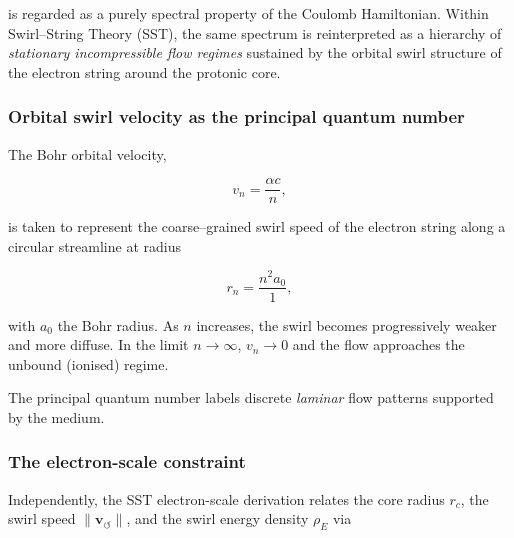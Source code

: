 \documentclass[10pt,reprint,aps,onecolumn,nofootinbib]{revtex4-2}
\begin{document}
        is regarded as a purely spectral property of the Coulomb Hamiltonian.
        Within Swirl--String Theory (SST), the same spectrum is reinterpreted as
        a hierarchy of \emph{stationary incompressible flow regimes} sustained
        by the orbital swirl structure of the electron string around the
        protonic core.

        \subsubsection*{Orbital swirl velocity as the principal quantum number}

            The Bohr orbital velocity,

            \begin{equation}
                v_n = \frac{\alpha c}{n},
            \end{equation}

            is taken to represent the coarse--grained swirl speed of the electron
            string along a circular streamline at radius

            \begin{equation}
                r_n = \frac{n^2 a_0}{1},
            \end{equation}

            with $a_0$ the Bohr radius. As $n$ increases, the swirl becomes
            progressively weaker and more diffuse. In the limit $n\to\infty$,
            $v_n\to 0$ and the flow approaches the unbound (ionised) regime.

            The principal quantum number labels discrete \emph{laminar} flow
            patterns supported by the medium.

        \subsubsection*{The electron-scale constraint}

            Independently, the SST electron-scale derivation relates the core radius
            $r_c$, the swirl speed $\lVert \mathbf{v}_{\!\boldsymbol{\circlearrowleft}}
    \rVert$, and the swirl energy density $\rho_{\!E}$ via
\end{document}
